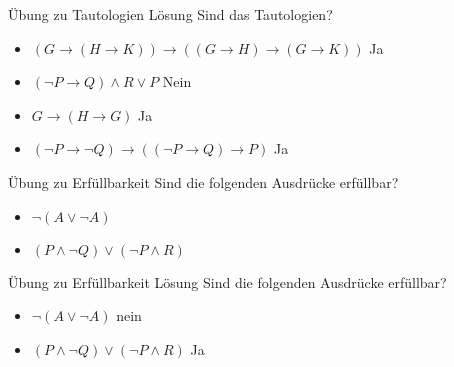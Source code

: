 \documentclass[handout]{beamer}
\begin{document}
\begin{frame} {Übung zu Tautologien Lösung}
Sind das Tautologien?
\begin{itemize}
	\item $(G \rightarrow (H \rightarrow K)) \rightarrow ((G \rightarrow H) \rightarrow (G \rightarrow K))$ \pause \hspace{0.3cm} Ja
	\item $(\lnot P \rightarrow Q) \land R \lor P$ \pause \hspace{0.3cm} Nein
	\item $G \rightarrow (H \rightarrow G)$ \pause \hspace{0.3cm} Ja
	\item $(\lnot P \rightarrow \lnot Q) \rightarrow ((\lnot P \rightarrow Q) \rightarrow P)$ \pause \hspace{0.3cm} Ja
\end{itemize}
\end{frame}


\begin{frame} {Übung zu Erfüllbarkeit}
	Sind die folgenden Ausdrücke erfüllbar?
	\begin{itemize}
		\item $ \lnot (A \lor \lnot A) $ \pause \hspace{0.3cm} 
		\item $(P \land \lnot Q) \lor (\lnot P \land R)$ \pause \hspace{0.3cm} 
		
	\end{itemize}
\end{frame}

\begin{frame} {Übung zu Erfüllbarkeit Lösung}
	Sind die folgenden Ausdrücke erfüllbar?
	\begin{itemize}
		\item $ \lnot (A \lor \lnot A) $ \pause \hspace{0.3cm} nein
		\item $(P \land \lnot Q) \lor (\lnot P \land R)$ \pause \hspace{0.3cm} Ja
		
	\end{itemize}
\end{frame}


\end{document}
